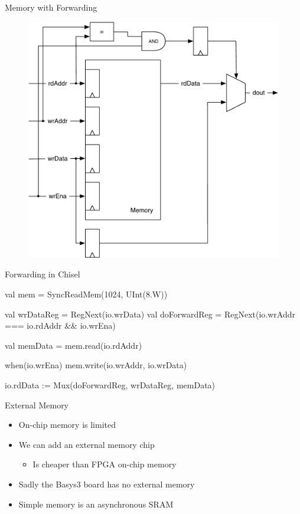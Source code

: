 \begin{frame}[fragile]{Memory with Forwarding}
\begin{figure}
  \includegraphics[scale=0.5]{../figures/memory-forwarding}
\end{figure}
\end{frame}

\begin{frame}[fragile]{Forwarding in Chisel}
\begin{chisel}
  val mem = SyncReadMem(1024, UInt(8.W))

  val wrDataReg = RegNext(io.wrData)
  val doForwardReg = RegNext(io.wrAddr === io.rdAddr && io.wrEna)

  val memData = mem.read(io.rdAddr)

  when(io.wrEna) {
    mem.write(io.wrAddr, io.wrData)
  }

  io.rdData := Mux(doForwardReg, wrDataReg, memData)
\end{chisel}
\end{frame}


\begin{frame}[fragile]{External Memory}
\begin{itemize}
\item On-chip memory is limited
\item We can add an external memory chip
\begin{itemize}
\item Is cheaper than FPGA on-chip memory
\end{itemize}
\item Sadly the Basys3 board has no external memory
\item Simple memory is an asynchronous SRAM
\end{itemize}
\end{frame}


